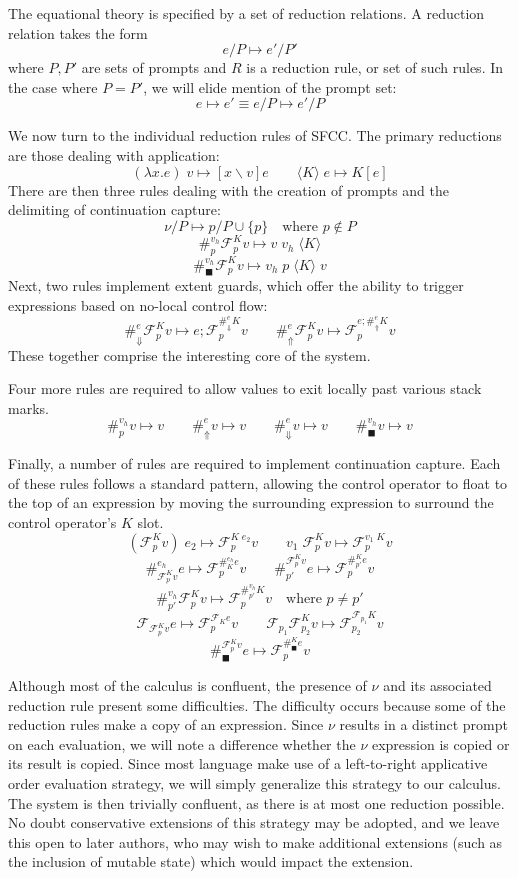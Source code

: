 \documentclass[11pt]{article}
\newcommand\x{\lambda x}
\newcommand\F{\mathcal{F}}
\newcommand{\angles}[1]{\langle#1\rangle}
\begin{document}
The equational theory is specified by a set of reduction relations.
A reduction relation takes the form
$$e/P \mapsto e'/P'$$
where $P, P'$ are sets of prompts and $R$ is a reduction rule, or set of such rules.
In the case where $P = P'$, we will elide mention of the prompt set:
$$e \mapsto e' \equiv e/P \mapsto e'/P$$


We now turn to the individual reduction rules of SFCC.
The primary reductions are those dealing with application:
$$(\x.e)\;v \mapsto [x \backslash v]e \qquad
  \angles{K}\;e \mapsto K[e]$$
There are then three rules dealing with the creation of prompts and the delimiting of continuation capture:
$$\nu/P \mapsto p/P\cup\{p\} \quad\textrm{where }p \notin P$$
$$\#_p^{v_h}\F_p^Kv \mapsto v\;v_h\;\angles K$$
$$\#_\blacksquare^{v_h}\F_p^K v \mapsto v_h\;p\;\angles{K}\;v$$
Next, two rules implement extent guards, which offer the ability to trigger expressions based on no-local control flow:
$$\#_{\Downarrow}^{e}\F_p^K v \mapsto e;\F_p^{\#_\Downarrow^{e}K}v \qquad
  \#_{\Uparrow}^{e}\F_p^K v \mapsto \F_p^{e;\#_\Uparrow^{e}K}v$$
These together comprise the interesting core of the system.

Four more rules are required to allow values to exit locally past various stack marks.
$$\#_p^{v_h} v \mapsto v \qquad
  \#_{\Uparrow}^{e}v \mapsto v \qquad
  \#_{\Downarrow}^{e}v \mapsto v \qquad
  \#_\blacksquare^{v_h}v \mapsto v$$

Finally, a number of rules are required to implement continuation capture.
Each of these rules follows a standard pattern, allowing the control operator to float to the top of an expression by moving the surrounding expression to surround the control operator's $K$ slot.
$$(\F^K_pv)\;e_2 \mapsto \F^{K\;e_2}_pv \qquad
  v_1\;\F^K_pv \mapsto \F^{v_1\;K}_pv$$
$$\#_{\F_p^Kv}^{e_h}e \mapsto \F_p^{\#_K^{e_h}e}v \qquad
  \#^{\F_p^Kv}_{p'}e \mapsto \F_p^{\#^K_{p'}e}v$$
$$\#_{p'}^{v_h}\F^K_pv \mapsto \F^{\#_{p'}^{v_h}K}_pv
  	\quad\textrm{where }p \neq p'$$
$$\F_{\F^K_pv}e \mapsto \F^{\F_Ke}_pv \qquad
  \F_{p_1}\F^K_{p_2}v \mapsto \F^{\F_{p_1}K}_{p_2}v$$
$$\#_\blacksquare^{\F_p^K v}e \mapsto \F_p^{\#_\blacksquare^K e}v$$

Although most of the calculus is confluent, the presence of $\nu$ and its associated reduction rule present some difficulties.
The difficulty occurs because some of the reduction rules make a copy of an expression.
Since $\nu$ results in a distinct prompt on each evaluation, we will note a difference whether the $\nu$ expression is copied or its result is copied.
Since most language make use of a left-to-right applicative order evaluation strategy, we will simply generalize this strategy to our calculus.
The system is then trivially confluent, as there is at most one reduction possible.
No doubt conservative extensions of this strategy may be adopted, and we leave this open to later authors, who may wish to make additional extensions (such as the inclusion of mutable state) which would impact the extension.
\end{document}
